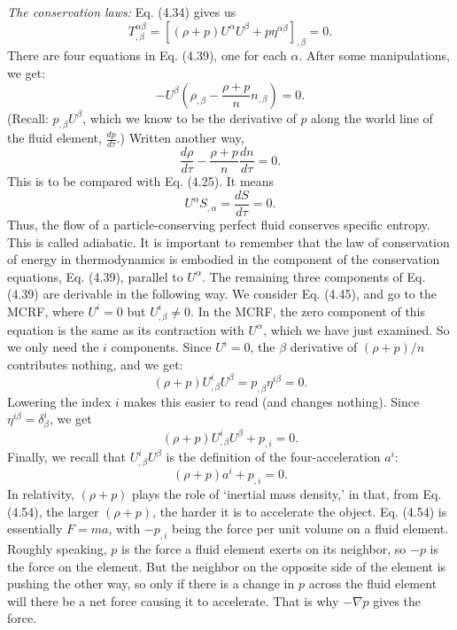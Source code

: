 \documentclass[12pt]{book}
\begin{document}
    \textit{The conservation laws:} 
    Eq. (4.34) gives us
    \[
    T^{\alpha\beta}_{,\beta} = \left[ (\rho + p) U^\alpha U^\beta + p \eta^{\alpha\beta} \right]_{,\beta} = 0. \tag{4.39}
    \]
    There are four equations in Eq. (4.39), one for each \(\alpha\). After some manipulations, we get:
    \[
    - U^\beta \left( \rho_{,\beta} - \frac{\rho + p}{n} n_{,\beta} \right) = 0. \tag{4.48}
    \]
    (Recall: \(p_{,\beta} U^\beta\), which we know to be the derivative of \(p\) along the world line of the fluid element, \(\frac{dp}{d\tau}\).) Written another way, 
    \[
    \frac{d \rho}{d \tau} - \frac{\rho + p}{n} \frac{d n}{d \tau} = 0. \tag{4.49}
    \]
    This is to be compared with Eq. (4.25). It means
    \[
    U^\alpha S_{,\alpha} = \frac{dS}{d \tau} = 0. \tag{4.50}
    \]
    Thus, the flow of a particle-conserving perfect fluid conserves specific entropy. This is called adiabatic. It is important to remember that the law of conservation of energy in thermodynamics is embodied in the component of the conservation equations, Eq. (4.39), parallel to \(U^\alpha\). The remaining three components of Eq. (4.39) are derivable in the following way. We consider Eq. (4.45), and go to the MCRF, where \(U^i = 0\) but \(U^i_{,\beta} \neq 0\). In the MCRF, the zero component of this equation is the same as its contraction with \(U^\alpha\), which we have just examined. So we only need the \(i\) components. Since \(U^i = 0\), the \(\beta\) derivative of \((\rho + p)/n\) contributes nothing, and we get:
    \[
    (\rho + p) U^i_{,\beta} U^\beta = p_{,\beta} \eta^{i\beta} = 0. \tag{4.52}
    \]
    Lowering the index \(i\) makes this easier to read (and changes nothing). Since \(\eta^{i\beta} = \delta^i_\beta\), we get
    \[
    (\rho + p) U^i_{,\beta} U^\beta + p_{,i} = 0. \tag{4.53}
    \]
    Finally, we recall that \(U^i_{,\beta} U^\beta\) is the definition of the four-acceleration \(a^i\):
    \[
    (\rho + p) a^i + p_{,i} = 0. \tag{4.54}
    \]
    In relativity, \((\rho + p)\) plays the role of ‘inertial mass density,’ in that, from Eq. (4.54), the larger \((\rho + p)\), the harder it is to accelerate the object. Eq. (4.54) is essentially \(F = ma\), with \(-p_{,i}\) being the force per unit volume on a fluid element. Roughly speaking, \(p\) is the force a fluid element exerts on its neighbor, so \(-p\) is the force on the element. But the neighbor on the opposite side of the element is pushing the other way, so only if there is a change in \(p\) across the fluid element will there be a net force causing it to accelerate. That is why \(-\nabla p\) gives the force.
    
\end{document}
